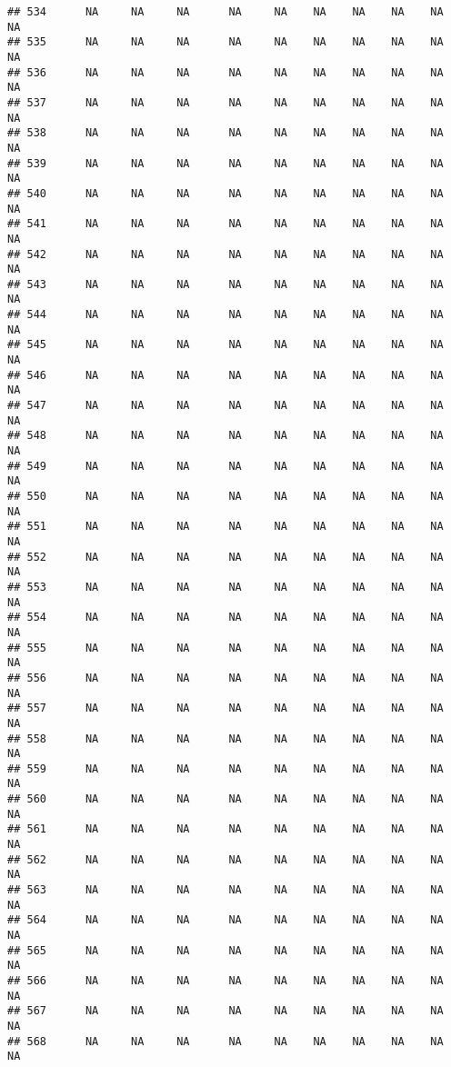 \documentclass{article}\usepackage{graphicx, color}
\makeatletter
\newenvironment{kframe}{%
 \def\at@end@of@kframe{}%
 \ifinner\ifhmode%
  \def\at@end@of@kframe{\end{minipage}}%
  \begin{minipage}{\columnwidth}%
 \fi\fi%
 \def\FrameCommand##1{\hskip\@totalleftmargin \hskip-\fboxsep
 \colorbox{shadecolor}{##1}\hskip-\fboxsep
     \hskip-\linewidth \hskip-\@totalleftmargin \hskip\columnwidth}%
 \MakeFramed {\advance\hsize-\width
   \@totalleftmargin\z@ \linewidth\hsize
   \@setminipage}}%
 {\par\unskip\endMakeFramed%
 \at@end@of@kframe}
\newenvironment{knitrout}{}{} %
\makeatother
\begin{document}
\begin{knitrout}
\begin{kframe}
\begin{verbatim}
## 534      NA     NA     NA      NA     NA    NA    NA    NA    NA     NA
## 535      NA     NA     NA      NA     NA    NA    NA    NA    NA     NA
## 536      NA     NA     NA      NA     NA    NA    NA    NA    NA     NA
## 537      NA     NA     NA      NA     NA    NA    NA    NA    NA     NA
## 538      NA     NA     NA      NA     NA    NA    NA    NA    NA     NA
## 539      NA     NA     NA      NA     NA    NA    NA    NA    NA     NA
## 540      NA     NA     NA      NA     NA    NA    NA    NA    NA     NA
## 541      NA     NA     NA      NA     NA    NA    NA    NA    NA     NA
## 542      NA     NA     NA      NA     NA    NA    NA    NA    NA     NA
## 543      NA     NA     NA      NA     NA    NA    NA    NA    NA     NA
## 544      NA     NA     NA      NA     NA    NA    NA    NA    NA     NA
## 545      NA     NA     NA      NA     NA    NA    NA    NA    NA     NA
## 546      NA     NA     NA      NA     NA    NA    NA    NA    NA     NA
## 547      NA     NA     NA      NA     NA    NA    NA    NA    NA     NA
## 548      NA     NA     NA      NA     NA    NA    NA    NA    NA     NA
## 549      NA     NA     NA      NA     NA    NA    NA    NA    NA     NA
## 550      NA     NA     NA      NA     NA    NA    NA    NA    NA     NA
## 551      NA     NA     NA      NA     NA    NA    NA    NA    NA     NA
## 552      NA     NA     NA      NA     NA    NA    NA    NA    NA     NA
## 553      NA     NA     NA      NA     NA    NA    NA    NA    NA     NA
## 554      NA     NA     NA      NA     NA    NA    NA    NA    NA     NA
## 555      NA     NA     NA      NA     NA    NA    NA    NA    NA     NA
## 556      NA     NA     NA      NA     NA    NA    NA    NA    NA     NA
## 557      NA     NA     NA      NA     NA    NA    NA    NA    NA     NA
## 558      NA     NA     NA      NA     NA    NA    NA    NA    NA     NA
## 559      NA     NA     NA      NA     NA    NA    NA    NA    NA     NA
## 560      NA     NA     NA      NA     NA    NA    NA    NA    NA     NA
## 561      NA     NA     NA      NA     NA    NA    NA    NA    NA     NA
## 562      NA     NA     NA      NA     NA    NA    NA    NA    NA     NA
## 563      NA     NA     NA      NA     NA    NA    NA    NA    NA     NA
## 564      NA     NA     NA      NA     NA    NA    NA    NA    NA     NA
## 565      NA     NA     NA      NA     NA    NA    NA    NA    NA     NA
## 566      NA     NA     NA      NA     NA    NA    NA    NA    NA     NA
## 567      NA     NA     NA      NA     NA    NA    NA    NA    NA     NA
## 568      NA     NA     NA      NA     NA    NA    NA    NA    NA     NA

\end{verbatim}
\end{kframe}
\end{knitrout}
\end{document}
